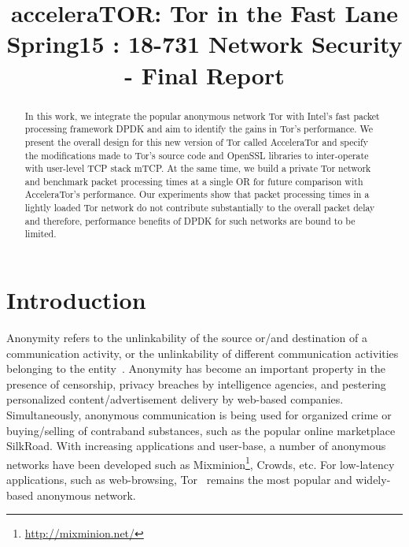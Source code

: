 \documentclass[conference]{IEEEtran}
\begin{document}
\title{acceleraTOR: Tor in the Fast Lane\\ 
  {\Large Spring15 : 18-731 Network Security - Final Report}
}

\author{
\and
{}
\and
{}
\and
{}
}

\maketitle


%
\begin{abstract}
In this work, we integrate the popular anonymous network Tor with Intel's fast packet processing framework DPDK and aim to identify the gains in Tor's performance. We present the overall design for this new version of Tor called AcceleraTor and specify the  modifications made to Tor's source code and OpenSSL libraries to inter-operate with user-level TCP stack mTCP. At the same time, we build a private Tor network and benchmark packet processing times at a single OR for future comparison with AcceleraTor's performance. Our experiments show that packet processing times in a lightly loaded Tor network do not contribute substantially to the overall packet delay and therefore, performance benefits of DPDK for such networks are bound to be limited.
\end{abstract}

% 
\section{Introduction}
\label{sec:intro}
Anonymity refers to the unlinkability of the source or\slash and destination of a communication activity, or the unlinkability of different communication activities belonging to the entity~\cite{Pfitzmann2001}. Anonymity has become an important property in the presence of censorship, privacy breaches by intelligence agencies, and pestering personalized content\slash advertisement delivery by web-based companies. Simultaneously, anonymous communication is being used for organized crime or buying\slash selling of contraband substances, such as the popular online marketplace SilkRoad. With increasing applications and user-base, a number of anonymous networks have been developed such as Mixminion\footnote{\url{http://mixminion.net/}}, Crowds\cite{Reiter:1998:CAW:290163.290168}, etc. For low-latency applications, such as web-browsing, Tor~\cite{Dingledine:2004:TSO:1251375.1251396} remains the most popular and widely-based anonymous network.
\end{document}
